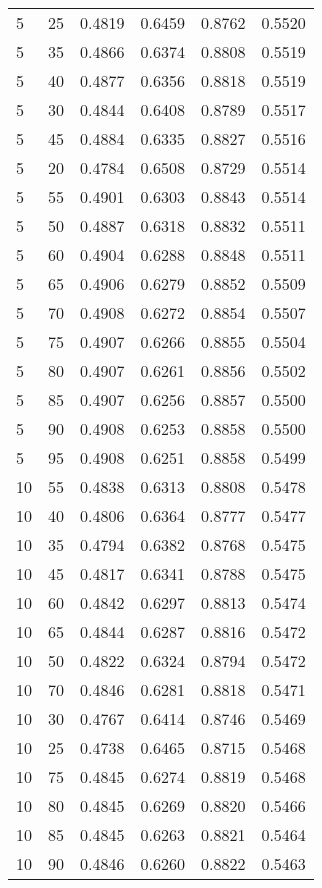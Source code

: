 \begin{center}
\begin{longtable}{|l|l|l|l|l|l|}
5  & 25 & 0.4819 & 0.6459 & 0.8762 & 0.5520 \\
5  & 35 & 0.4866 & 0.6374 & 0.8808 & 0.5519 \\
5  & 40 & 0.4877 & 0.6356 & 0.8818 & 0.5519 \\
5  & 30 & 0.4844 & 0.6408 & 0.8789 & 0.5517 \\
5  & 45 & 0.4884 & 0.6335 & 0.8827 & 0.5516 \\
5  & 20 & 0.4784 & 0.6508 & 0.8729 & 0.5514 \\
5  & 55 & 0.4901 & 0.6303 & 0.8843 & 0.5514 \\
5  & 50 & 0.4887 & 0.6318 & 0.8832 & 0.5511 \\
5  & 60 & 0.4904 & 0.6288 & 0.8848 & 0.5511 \\
5  & 65 & 0.4906 & 0.6279 & 0.8852 & 0.5509 \\
5  & 70 & 0.4908 & 0.6272 & 0.8854 & 0.5507 \\
5  & 75 & 0.4907 & 0.6266 & 0.8855 & 0.5504 \\
5  & 80 & 0.4907 & 0.6261 & 0.8856 & 0.5502 \\
5  & 85 & 0.4907 & 0.6256 & 0.8857 & 0.5500 \\
5  & 90 & 0.4908 & 0.6253 & 0.8858 & 0.5500 \\
5  & 95 & 0.4908 & 0.6251 & 0.8858 & 0.5499 \\
10 & 55 & 0.4838 & 0.6313 & 0.8808 & 0.5478 \\
10 & 40 & 0.4806 & 0.6364 & 0.8777 & 0.5477 \\
10 & 35 & 0.4794 & 0.6382 & 0.8768 & 0.5475 \\
10 & 45 & 0.4817 & 0.6341 & 0.8788 & 0.5475 \\
10 & 60 & 0.4842 & 0.6297 & 0.8813 & 0.5474 \\
10 & 65 & 0.4844 & 0.6287 & 0.8816 & 0.5472 \\
10 & 50 & 0.4822 & 0.6324 & 0.8794 & 0.5472 \\
10 & 70 & 0.4846 & 0.6281 & 0.8818 & 0.5471 \\
10 & 30 & 0.4767 & 0.6414 & 0.8746 & 0.5469 \\
10 & 25 & 0.4738 & 0.6465 & 0.8715 & 0.5468 \\
10 & 75 & 0.4845 & 0.6274 & 0.8819 & 0.5468 \\
10 & 80 & 0.4845 & 0.6269 & 0.8820 & 0.5466 \\
10 & 85 & 0.4845 & 0.6263 & 0.8821 & 0.5464 \\
10 & 90 & 0.4846 & 0.6260 & 0.8822 & 0.5463 \\

\end{longtable}
\end{center}
